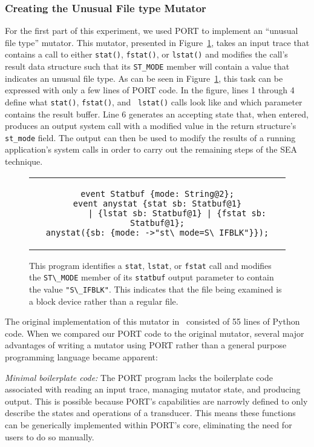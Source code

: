 \subsubsection{Creating the Unusual File type Mutator}
\label{subsub:UnusualFiletype}
For the first part of this experiment,
we used PORT to implement an ``unusual file type''
mutator.
This mutator, presented in
Figure~\ref{lst:UnusualFiletypePORT},
takes an input trace
that contains a call to either {\tt stat()},
{\tt fstat()},
or {\tt lstat()}
and modifies the call's result data structure such
that its {\tt ST\_MODE} member will contain a value
that indicates an unusual file type.
As can be seen in
Figure~\ref{lst:UnusualFiletypePORT}, this task can be expressed with only a few lines of PORT code.  In the figure,
lines 1 through 4 define what {\tt stat()}, {\tt fstat()}, and {\tt
lstat()} calls look like and which parameter contains the result buffer.
Line 6 generates an accepting state that, when entered, produces an output
system call with a modified value in the return structure's {\tt st\_mode}
field.  The output can then be used to modify the results of a running
application's system calls in order to carry out the remaining steps of the
SEA technique.

\begin{figure}
\centering
\begin{tabular}{c}
\begin{lstlisting}
event Statbuf {mode: String@2};
event anystat {stat sb: Statbuf@1}
        | {lstat sb: Statbuf@1} | {fstat sb: Statbuf@1};
anystat({sb: {mode: ->"st\_mode=S\_IFBLK"}});
\end{lstlisting}
\end{tabular}
\caption{This program identifies a \texttt{stat}, \texttt{lstat}, or \texttt{fstat} call and modifies
  the \lstinline+ST\_MODE+ member of its \lstinline+statbuf+ output parameter to contain the value
  \lstinline+"S\_IFBLK"+. This indicates that the file being examined is a block device
  rather than a regular file.}
\label{lst:UnusualFiletypePORT}
\end{figure}

The original implementation of this mutator in~\cite{DBLP:conf/issre/MooreCFW19} consisted of 55 lines
of Python code.
When we compared our PORT code to the original mutator,
several major advantages
of writing a mutator using
PORT rather than a general purpose programming language
became apparent:

\textit{Minimal boilerplate code:} The PORT program lacks the boilerplate
code associated with
reading an input trace, managing mutator state, and producing output.
This is possible because PORT's capabilities are narrowly defined to
only describe the states and operations of a transducer.  This means these
functions can be generically implemented within PORT's core, eliminating
the need for users to do so manually.

